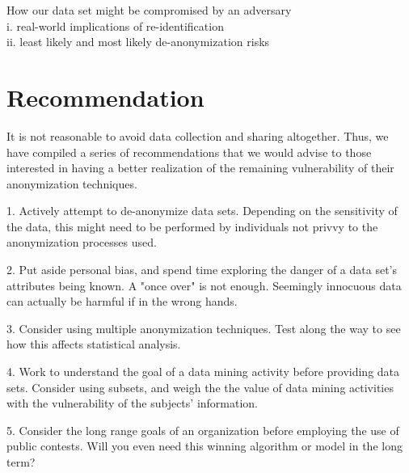 \documentclass[10pt,journal,compsoc]{IEEEtran}
\begin{document}
	
 How our data set might be compromised by an adversary\\
\indent i. real-world implications of re-identification\\
\indent ii. least likely and most likely de-anonymization risks\\
\section{Recommendation}

	It is not reasonable to avoid data collection and sharing altogether.  Thus, we have compiled a series of recommendations that we would advise to those interested in having a better realization of the remaining vulnerability of their anonymization techniques.\linebreak
	
1. Actively attempt to de-anonymize data sets.  Depending on the sensitivity of the data, this might need to be performed by individuals not privvy to the anonymization processes used.\linebreak

2.  Put aside personal bias, and spend time exploring the danger of a data set's attributes being known.  A "once over" is not enough.  Seemingly innocuous data can actually be harmful if in the wrong hands.\linebreak

3.  Consider using multiple anonymization techniques.  Test along the way to see how this affects statistical analysis.\linebreak

4.  Work to understand the goal of a data mining activity before providing data sets. Consider using subsets, and weigh the the value of data mining activities with the vulnerability of the subjects' information.\linebreak

5.  Consider the long range goals of an organization before employing the use of public contests.  Will you even need this winning algorithm or model in the long term?



%
%
\end{document}
